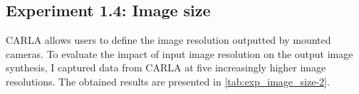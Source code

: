 








\subsection{Experiment 1.4: Image size} \label{sec:exp-image-resolution}
CARLA allows users to define the image resolution outputted by mounted cameras. To evaluate the impact of input image resolution on the output image synthesis, I captured data from CARLA at five increasingly higher image resolutions. The obtained results are presented in \autoref{tab:exp_image_size-2}.

